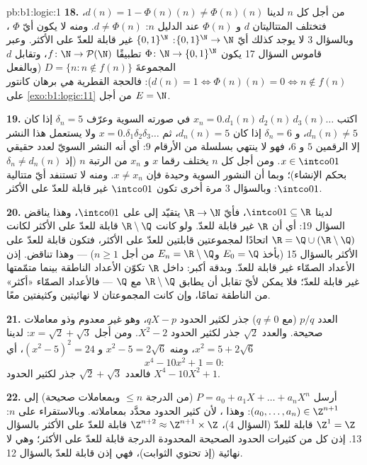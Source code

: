 \begin{solution}{pb:b1:logic:1}
\textbf{18.} من أجل كل $n$ لدينا $d(n) = 1 - \Phi(n)(n) \neq \Phi(n)(n)$،
فتختلف المتتاليتان $d$ و $\Phi(n)$ عند الدليل $n$: $d \neq
\Phi(n)$. ومنه لا يكون أيّ $\Phi$ ، وبالسؤال 3 لا يوجد كذلك أيّ
 $\{0,1\}^{\N} \to \N$:  $\{0,1\}^{\N}$ غير
قابلة للعدّ على الأكثر. وعبر قاموس السؤال 17 يكون  $\Phi
\colon \N \to \{0,1\}^{\N}$ تطبيقًا $f \colon \N \to
\mathcal{P}(\N)$، وتقابل $d$ المجموعةَ $D = \{n : n
\notin f(n)\}$ (وبالفعل $d(n) = 1 \iff \Phi(n)(n) = 0 \iff n \notin
f(n)$): فالحجة القطرية \emph{هي} برهان كانتور على
\cref{exo:b1:logic:11} من أجل $E = \N$.

\textbf{19.} اكتب $x_n = 0.d_1(n)\,d_2(n)\,d_3(n)\dots$ في صورته
السوية وعرّف $\delta_n = 5$ إذا كان $d_n(n) \neq 5$، و $\delta_n = 6$
إذا كان $d_n(n) = 5$، ثم $x = 0.\delta_1\delta_2\delta_3\dots$ ولا
يستعمل هذا النشر إلا الرقمين $5$ و $6$، فهو لا ينتهي بسلسلة من
الأرقام $9$: أي أنه النشر السويّ لعدد حقيقي $x \in \intco01$.
ومن أجل كل $n$ يختلف رقما $x$ و $x_n$ من الرتبة $n$
(إذ $\delta_n \neq d_n(n)$ بحكم الإنشاء)؛ وبما أن النشور السوية
وحيدة فإن $x \neq x_n$. ومنه لا تستنفد أيّ متتالية $\intco01$:
وبالسؤال 3 مرة أخرى تكون $\intco01$ غير قابلة للعدّ على الأكثر.

\textbf{20.} لدينا $\intco01 \subseteq \R$، فأيّ 
$\R \to \N$ يتقيّد إلى  على $\intco01$، وهذا يناقض
السؤال 19: أي أن $\R$ غير قابلة للعدّ. ولو كانت
$\R \setminus \Q$ قابلة للعدّ على الأكثر لكانت
$\R = \Q \cup (\R \setminus \Q)$ اتحادًا لمجموعتين قابلتين
للعدّ على الأكثر، فتكون قابلة للعدّ على الأكثر بالسؤال 15 (بأخذ
$E_0 = \Q$ و$E_n = \R \setminus \Q$ من أجل $n \geq 1$) ---
وهذا تناقض. إذن الأعداد الصمّاء غير قابلة للعدّ. وبدقة أكبر:
داخل $\R$ تكوّن الأعداد الناطقة  بينما متمّمتها
غير قابلة للعدّ؛ فلا يمكن لأيّ تقابل أن يطابق $\R
\setminus \Q$ مع $\Q$ --- فالأعداد الصمّاء «أكثر» من الناطقة تمامًا،
وإن كانت المجموعتان لا نهائيتين وكثيفتين معًا.

\textbf{21.} العدد $p/q$ (مع $q \neq 0$) جذر لكثير الحدود $qX - p$،
وهو غير معدوم وذو معاملات صحيحة. والعدد $\sqrt 2$ جذر
لكثير الحدود $X^2 - 2$. ومن أجل $x = \sqrt 2 + \sqrt 3$: لدينا $x^2 = 5 + 2\sqrt 6$، ومنه
$x^2 - 5 = 2\sqrt 6$ و $(x^2 - 5)^2 = 24$، أي
\[
x^4 - 10x^2 + 1 = 0 :
\]
فالعدد $\sqrt 2 + \sqrt 3$ جذر لكثير الحدود $X^4 - 10X^2 + 1$.

\textbf{22.} أرسل $P = a_0 + a_1X + \dots + a_nX^n$ (من الدرجة $\leq n$
وبمعاملات صحيحة) إلى $(a_0, \dots, a_n) \in \Z^{n+1}$: وهذا ، لأن كثير الحدود محدَّد بمعاملاته. وبالاستقراء على $n$:
 $\Z^1 = \Z$ قابلة للعدّ (السؤال 4)، 
$\Z^{n+2} \approx \Z^{n+1} \times \Z$ قابلة للعدّ على الأكثر بالسؤال 13.
إذن كل  من كثيرات الحدود الصحيحة المحدودة الدرجة قابلة للعدّ
على الأكثر؛ وهي لا نهائية (إذ تحتوي الثوابت)، فهي إذن قابلة للعدّ
بالسؤال 12.


\end{solution}

